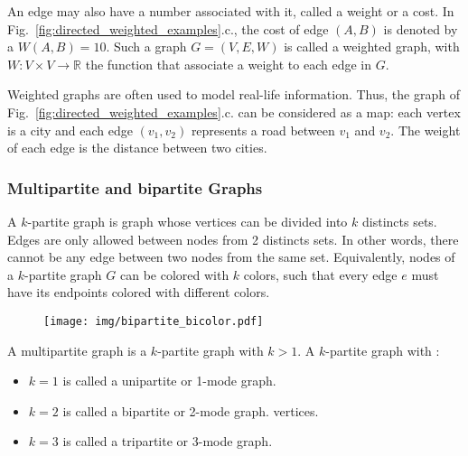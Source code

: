 \documentclass[table]{report}
\begin{document}
An edge may also have a number associated with it, called a weight or a cost. In Fig.~\ref{fig:directed_weighted_examples}.c., the cost of edge $(A,B)$ is denoted by a $W(A,B)=10$. Such a graph $G = (V,E,W)$ is called a weighted graph, with $W:V \times V \rightarrow \mathbb{R}$ the function that associate a weight to each edge in $G$.
 

\medbreak
Weighted graphs are often used to model real-life information. Thus, the graph of Fig.~\ref{fig:directed_weighted_examples}.c. can be considered as a map: each vertex is a city and each edge $(v_1,v_2)$ represents a road between $v_1$ and $v_2$. The weight of each edge is the distance between two cities.

%





\subsubsection{Multipartite and bipartite Graphs}

A $k$-partite graph is graph whose vertices can be divided into $k$ distincts sets. Edges are only allowed between nodes from 2 distincts sets. In other words, there cannot be any edge between two nodes from the same set. Equivalently, nodes of a $k$-partite graph $G$ can be colored with $k$ colors, such that every edge $e$ must have its endpoints colored with different colors.


\begin{figure}[h]%
\centering
\texttt{[image: img/bipartite\_bicolor.pdf]}
\caption{}
\label{fig:bipartite_bicolor}
\end{figure}
\FloatBarrier


A multipartite graph is a $k$-partite graph with $k>1$.
A $k$-partite graph with :
\begin{itemize}[noitemsep]
\item $k=1$ is called a unipartite or 1-mode graph.
\item $k=2$ is called a bipartite or 2-mode graph. vertices.
\item $k=3$ is called a tripartite or 3-mode graph. 
\end{itemize}
\end{document}
